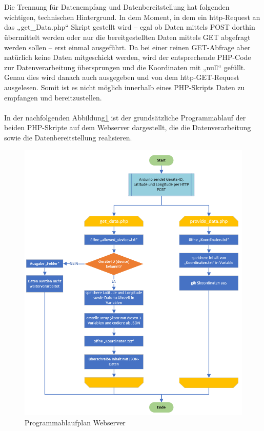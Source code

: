 \\
\\
Die Trennung für Datenempfang und Datenbereitstellung hat folgenden wichtigen, technischen Hintergrund. In dem Moment, in dem ein http-Request an das „get\_Data.php“ Skript gestellt wird – egal ob Daten mittels POST dorthin übermittelt werden oder nur die bereitgestellten Daten mittels GET abgefragt werden sollen –  erst einmal ausgeführt. Da bei einer reinen GET-Abfrage aber natürlich keine Daten mitgeschickt werden, wird der entsprechende PHP-Code zur Datenverarbeitung übersprungen und die Koordinaten mit „null“ gefüllt. Genau dies wird danach auch ausgegeben und von dem http-GET-Request ausgelesen. Somit ist es nicht möglich innerhalb eines PHP-Skripts Daten zu empfangen und bereitzustellen.
\\
\\
In der nachfolgenden Abbildung\ref{server-pap} ist der grundsätzliche Programmablauf der beiden PHP-Skripte auf dem Webserver dargestellt, die die Datenverarbeitung sowie die Datenbereitstellung realisieren.
\begin{figure} [H]
	\begin{center}
		\includegraphics[width=1\textwidth]{Bilder/Webserver_PAP.png}
		\caption{Programmablaufplan Webserver}
		\label{server-pap}
	\end{center}
\end{figure}

